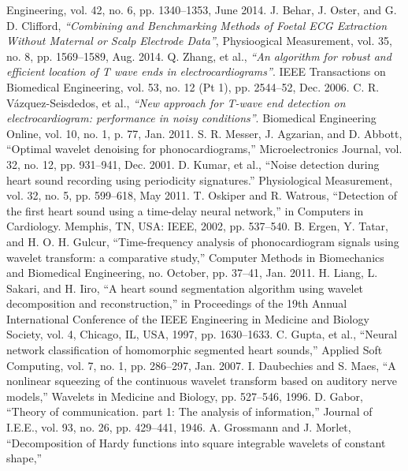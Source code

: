 \begin{thebibliography}{9}
  Engineering, vol. 42, no. 6, pp. 1340–1353, June 2014.
  J. Behar, J. Oster, and G. D. Clifford, \textit{“Combining and Benchmarking
  Methods of Foetal ECG Extraction Without Maternal or Scalp Electrode Data”}, Physioogical Measurement, vol. 35, no.
  8, pp. 1569–1589, Aug. 2014.
  Q. Zhang, et al., \textit{“An algorithm for robust and efficient location of T wave ends in electrocardiograms”}.
  IEEE Transactions on Biomedical Engineering, vol. 53, no. 12 (Pt 1), pp. 2544–52, Dec. 2006.
  C. R. Vázquez-Seisdedos, et al., \textit{“New approach for T-wave end detection on electrocardiogram: performance
  in noisy conditions”}. Biomedical Engineering Online, vol. 10, no. 1, p. 77, Jan. 2011.
  S. R. Messer, J. Agzarian, and D. Abbott, “Optimal wavelet denoising for phonocardiograms,” Microelectronics
  Journal, vol. 32, no. 12, pp. 931–941, Dec. 2001.
  D. Kumar, et al., “Noise detection during heart sound recording using periodicity signatures.” Physiological
  Measurement, vol. 32, no. 5, pp. 599–618, May 2011.
  T. Oskiper and R. Watrous, “Detection of the first heart sound using a time-delay neural network,” in Computers in
  Cardiology. Memphis, TN, USA: IEEE, 2002, pp. 537–540.
  B. Ergen, Y. Tatar, and H. O. H. Gulcur, “Time-frequency analysis of phonocardiogram signals using wavelet
  transform: a comparative study,” Computer Methods in Biomechanics and Biomedical Engineering, no. October, pp.
  37–41, Jan. 2011.
  H. Liang, L. Sakari, and H. Iiro, “A heart sound segmentation algorithm using wavelet decomposition and
  reconstruction,” in Proceedings of the 19th Annual International Conference of the IEEE Engineering in Medicine and
  Biology Society, vol. 4, Chicago, IL, USA, 1997, pp. 1630–1633.
  C. Gupta, et al., “Neural network classification of homomorphic segmented heart sounds,” Applied Soft Computing,
  vol. 7, no. 1, pp. 286–297, Jan. 2007.
  I. Daubechies and S. Maes, “A nonlinear squeezing of the continuous wavelet transform based on auditory nerve
  models,” Wavelets in Medicine and Biology, pp. 527–546, 1996.
  D. Gabor, “Theory of communication. part 1: The analysis of information,” Journal of I.E.E., vol. 93, no. 26, pp.
  429–441, 1946.
  A. Grossmann and J. Morlet, “Decomposition of Hardy functions into square integrable wavelets of constant shape,”

\end{thebibliography}
